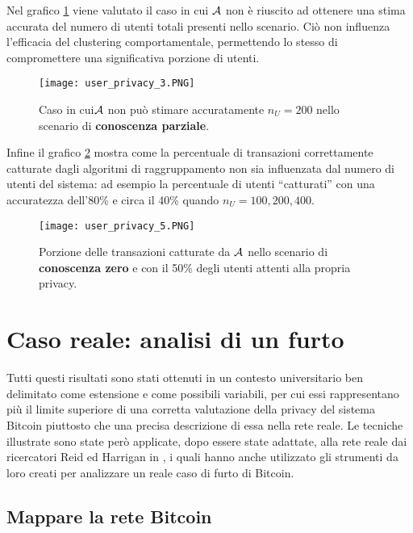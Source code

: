 Nel grafico \ref{userprivacy_fig_3} viene valutato il caso in cui $\mathcal{A}$ non è riuscito ad ottenere una stima accurata del numero di utenti totali presenti nello scenario. Ciò non influenza l'efficacia del clustering comportamentale, permettendo lo stesso di compromettere una significativa porzione di utenti.

\begin{figure}[htbp]
\centering
\texttt{[image: user\_privacy\_3.PNG]}
\caption[Stima degli utenti non corretta]{Caso in cui$\mathcal{A}$ non può stimare accuratamente $n_U = 200$ nello scenario di \textbf{conoscenza parziale}.\label{userprivacy_fig_3}}
\end{figure}

Infine il grafico \ref{userprivacy_fig_5} mostra come la percentuale di transazioni correttamente catturate dagli algoritmi di raggruppamento non sia influenzata dal numero di utenti del sistema: ad esempio la percentuale di utenti ``catturati'' con una accuratezza dell'80\% e circa il 40\% quando $n_U = 100, 200, 400$.

\begin{figure}[htbp]
\centering
\texttt{[image: user\_privacy\_5.PNG]}
\caption[Transazioni associate ad utenti con conoscenza zero]{Porzione delle transazioni catturate da $\mathcal{A}$ nello scenario di \textbf{conoscenza zero} e con il 50\% degli utenti attenti alla propria privacy.\label{userprivacy_fig_5}}
\end{figure}

\section{Caso reale: analisi di un furto}

Tutti questi risultati sono stati ottenuti in un contesto universitario ben delimitato come estensione e come possibili variabili, per cui essi rappresentano più il limite superiore di una corretta valutazione della privacy del sistema Bitcoin piuttosto che una precisa descrizione di essa nella rete reale.
Le tecniche illustrate sono state però applicate, dopo essere state adattate, alla rete reale dai ricercatori Reid ed Harrigan in \cite{anonimity}, i quali hanno anche utilizzato gli strumenti da loro creati per analizzare un reale caso di furto di Bitcoin.

\subsection{Mappare la rete Bitcoin}


